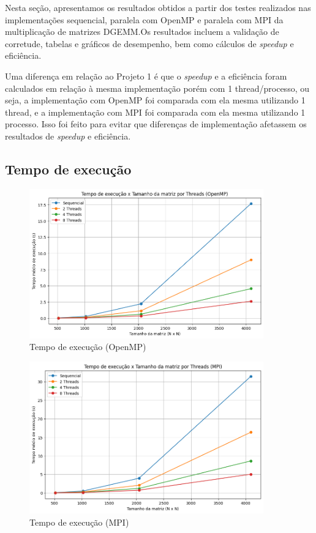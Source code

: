 \documentclass[12pt, a4paper]{article}
\begin{document}
    Nesta seção, apresentamos os resultados obtidos a partir dos testes realizados nas implementações sequencial, paralela com OpenMP e paralela com MPI da multiplicação de matrizes DGEMM.\@ Os resultados incluem a validação de corretude, tabelas e gráficos de desempenho, bem como cálculos de \emph{speedup} e eficiência.

    Uma diferença em relação ao Projeto 1 é que o \emph{speedup} e a eficiência foram calculados em relação à mesma implementação porém com 1 thread/processo, ou seja, a implementação com OpenMP foi comparada com ela mesma utilizando 1 thread, e a implementação com MPI foi comparada com ela mesma utilizando 1 processo. Isso foi feito para evitar que diferenças de implementação afetassem os resultados de \emph{speedup} e eficiência.

    \subsection{Tempo de execução}

    \begin{figure}[H]
        \centering
        \includegraphics[width=0.9\textwidth]{img/execution-time-openmp.png}
        \caption{Tempo de execução (OpenMP)}\label{fig:tempo_execucao_omp}
    \end{figure}

    \begin{figure}[H]
        \centering
        \includegraphics[width=0.9\textwidth]{img/execution-time-mpi.png}
        \caption{Tempo de execução (MPI)}\label{fig:tempo_execucao_mpi}
    \end{figure}
\end{document}
